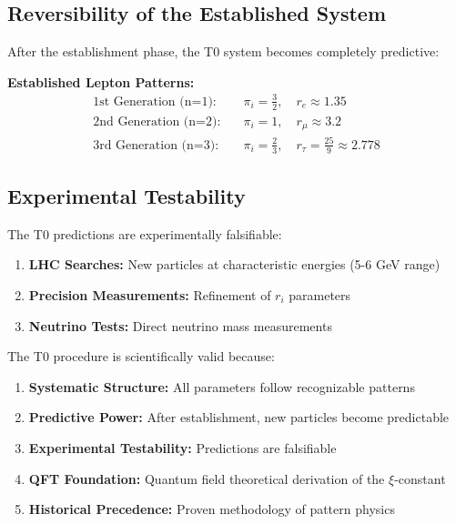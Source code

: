 	\subsection{Reversibility of the Established System}
	\label{subsec:reversibility}
	
	After the establishment phase, the T0 system becomes completely predictive:
	
	\textbf{Established Lepton Patterns:}
	\begin{align}
		\text{1st Generation (n=1):} \quad &\pi_i = \frac{3}{2}, \quad r_e \approx 1.35 \\
		\text{2nd Generation (n=2):} \quad &\pi_i = 1, \quad r_\mu \approx 3.2 \\
		\text{3rd Generation (n=3):} \quad &\pi_i = \frac{2}{3}, \quad r_\tau = \frac{25}{9} \approx 2.778
	\end{align}
	
	\subsection{Experimental Testability}
	\label{subsec:experimental_testability}
	
	The T0 predictions are experimentally falsifiable:
	
	\begin{enumerate}
		\item \textbf{LHC Searches:} New particles at characteristic energies (5-6 GeV range)
		\item \textbf{Precision Measurements:} Refinement of $r_i$ parameters
		\item \textbf{Neutrino Tests:} Direct neutrino mass measurements
	\end{enumerate}
	
	The T0 procedure is scientifically valid because:
	
	\begin{enumerate}
		\item \textbf{Systematic Structure:} All parameters follow recognizable patterns
		\item \textbf{Predictive Power:} After establishment, new particles become predictable
		\item \textbf{Experimental Testability:} Predictions are falsifiable
		\item \textbf{QFT Foundation:} Quantum field theoretical derivation of the $\xi$-constant
		\item \textbf{Historical Precedence:} Proven methodology of pattern physics
	\end{enumerate}
	
